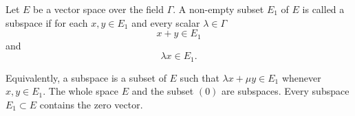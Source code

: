 Let $E$ be a vector space over the field $\Gamma$. A non-empty subset $E_1$ of $E$ is called a subspace if for each $x, y \in E_1$ and every scalar $\lambda \in \Gamma$
$$x + y \in E_1$$
and
$$\lambda x \in E_1.$$

Equivalently, a subspace is a subset of $E$ such that $\lambda x + \mu y \in E_1$ whenever $x, y \in E_1$. The whole space $E$ and the subset $(0)$ are subspaces. Every subspace $E_1 \subset E$ contains the zero vector.
